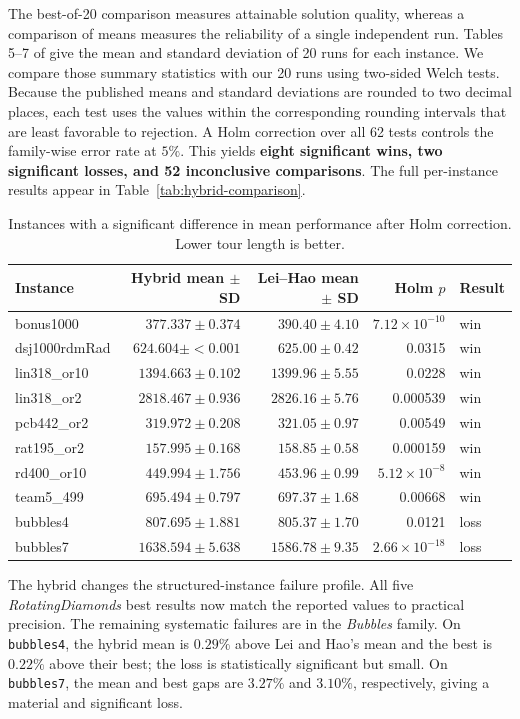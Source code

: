 \documentclass[11pt]{article}
\begin{document}
The best-of-20 comparison measures attainable solution quality, whereas a comparison of means measures the reliability of a single independent run. Tables 5--7 of \textcite{LeiHao2024} give the mean and standard deviation of 20 runs for each instance. We compare those summary statistics with our 20 runs using two-sided Welch tests. Because the published means and standard deviations are rounded to two decimal places, each test uses the values within the corresponding rounding intervals that are least favorable to rejection. A Holm correction over all 62 tests controls the family-wise error rate at $5\%$. This yields \textbf{eight significant wins, two significant losses, and 52 inconclusive comparisons}. The full per-instance results appear in Table~\ref{tab:hybrid-comparison}.

\begin{table}[H]
\centering
\caption{Instances with a significant difference in mean performance after Holm correction. Lower tour length is better.}
\label{tab:hybrid-significance}
\begin{tabular}{lrrrl}
\hline
Instance & Hybrid mean $\pm$ SD & Lei--Hao mean $\pm$ SD & Holm $p$ & Result \\
\hline
bonus1000 & $377.337 \pm 0.374$ & $390.40 \pm 4.10$ & $7.12\!\times\!10^{-10}$ & win \\
dsj1000rdmRad & $624.604 \pm {<}0.001$ & $625.00 \pm 0.42$ & 0.0315 & win \\
lin318\_or10 & $1394.663 \pm 0.102$ & $1399.96 \pm 5.55$ & 0.0228 & win \\
lin318\_or2 & $2818.467 \pm 0.936$ & $2826.16 \pm 5.76$ & 0.000539 & win \\
pcb442\_or2 & $319.972 \pm 0.208$ & $321.05 \pm 0.97$ & 0.00549 & win \\
rat195\_or2 & $157.995 \pm 0.168$ & $158.85 \pm 0.58$ & 0.000159 & win \\
rd400\_or10 & $449.994 \pm 1.756$ & $453.96 \pm 0.99$ & $5.12\!\times\!10^{-8}$ & win \\
team5\_499 & $695.494 \pm 0.797$ & $697.37 \pm 1.68$ & 0.00668 & win \\
bubbles4 & $807.695 \pm 1.881$ & $805.37 \pm 1.70$ & 0.0121 & loss \\
bubbles7 & $1638.594 \pm 5.638$ & $1586.78 \pm 9.35$ & $2.66\!\times\!10^{-18}$ & loss \\
\hline
\end{tabular}
\end{table}

The hybrid changes the structured-instance failure profile. All five \emph{RotatingDiamonds} best results now match the reported values to practical precision. The remaining systematic failures are in the \emph{Bubbles} family. On \texttt{bubbles4}, the hybrid mean is $0.29\%$ above Lei and Hao's mean and the best is $0.22\%$ above their best; the loss is statistically significant but small. On \texttt{bubbles7}, the mean and best gaps are $3.27\%$ and $3.10\%$, respectively, giving a material and significant loss.
\end{document}
